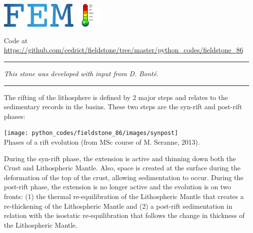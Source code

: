 \includegraphics[height=1.25cm]{images/pictograms/FEM}
\includegraphics[height=1.25cm]{images/pictograms/temperature}


\begin{center}
Code at \url{https://github.com/cedrict/fieldstone/tree/master/python_codes/fieldstone_86}
\end{center}

\par\noindent\rule{\textwidth}{0.4pt}

{\sl This stone was developed with input from D. Bont{\'e}}. 

\par\noindent\rule{\textwidth}{0.4pt}

The rifting of the lithosphere is defined by 2 major steps and relates to 
the sedimentary records in the basins. These two steps are the syn-rift 
and post-rift phases:

\begin{center}
\texttt{[image: python\_codes/fieldstone\_86/images/synpost]}\\
{\captionfont Phases of a rift evolution (from MSc course of M. Seranne, 2013).} 
\end{center}

During the syn-rift phase, the extension is active and thinning down both the 
Crust and Lithospheric Mantle. Also, space is created at the surface during the deformation 
of the top of the crust, allowing sedimentation to occur. During the post-rift phase, 
the extension is no longer active and the evolution is on two fronts: 
(1) the thermal re-equilibration of the Lithospheric Mantle that creates a re-thickening 
of the Lithospheric Mantle and 
(2) a post-rift sedimentation in relation with the isostatic re-equilibration that 
follows the change in thickness of the Lithospheric Mantle.

